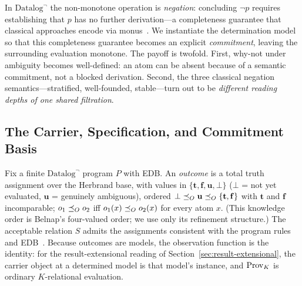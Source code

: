 
In $\mbox{Datalog}^\neg$ the non-monotone operation is \emph{negation}:
concluding $\neg p$ requires establishing that $p$ has no further
derivation---a completeness guarantee that classical approaches encode via
monus~\cite{dannert2021semiring}. We instantiate the determination model so
that this completeness guarantee becomes an explicit \emph{commitment},
leaving the surrounding evaluation monotone. The payoff is twofold. First,
why-not under ambiguity becomes well-defined: an atom can be absent because of
a semantic commitment, not a blocked derivation. Second, the three classical
negation semantics---stratified, well-founded, stable---turn out to be
\emph{different reading depths of one shared filtration}.

\subsection{The Carrier, Specification, and Commitment Basis}
\label{sec:datalog-setup}

Fix a finite $\mbox{Datalog}^\neg$ program $P$ with EDB. An \emph{outcome} is
a total truth assignment over the Herbrand base, with values in
$\{\mathbf{t}, \mathbf{f}, \mathbf{u}, \bot\}$ ($\bot$ = not yet evaluated,
$\mathbf{u}$ = genuinely ambiguous), ordered
$\bot \preceq_O \mathbf{u} \preceq_O \{\mathbf{t},\mathbf{f}\}$ with $\mathbf{t}$ and
$\mathbf{f}$ incomparable; $o_1 \preceq_O o_2$ iff $o_1(x) \preceq_O o_2(x)$ for every
atom $x$. (This knowledge order is Belnap's four-valued order; we use only its
refinement structure.) The acceptable relation $S$ admits the assignments
consistent with the program rules and EDB~\cite{gelfond1988stable}. Because
outcomes are models, the observation function is the identity: for the
result-extensional reading of Section~\ref{sec:result-extensional}, the
carrier object at a determined model is that model's instance, and
$\operatorname{Prov}_K$ is ordinary $K$-relational evaluation.

